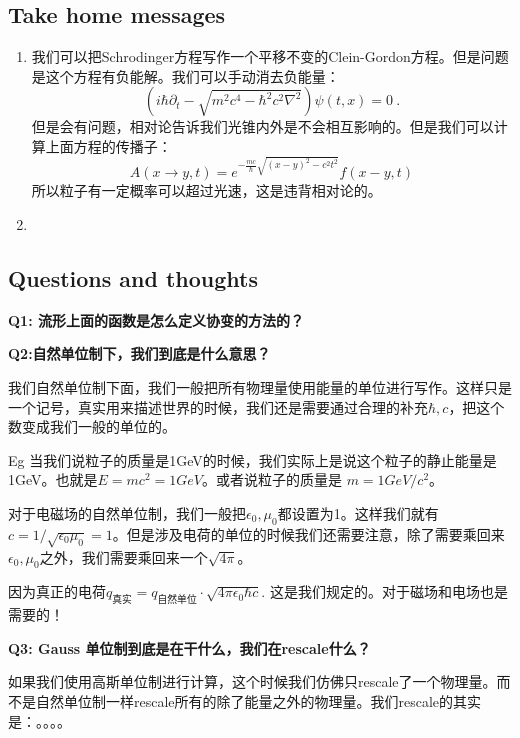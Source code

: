 \subsection{Take home messages}

\begin{enumerate}
  \item 我们可以把Schrodinger方程写作一个平移不变的Clein-Gordon方程。但是问题是这个方程有负能解。我们可以手动消去负能量：
    \begin{equation}
      (i\hbar\partial_t-\sqrt{m^2c^4-\hbar^2c^2\nabla^2})\psi(t,x)=0\mathrm{~.}
      \label{eq:nonegativenergyspectrum}
    \end{equation}
    但是会有问题，相对论告诉我们光锥内外是不会相互影响的。但是我们可以计算上面方程的传播子：
    \begin{equation}
      A(x\to y,t)=e^{-\frac{mc}{\hbar}\sqrt{(x-y)^2-c^2t^2}}f(x-y,t)
      \label{eq:propergagtiontest}
    \end{equation}
    所以粒子有一定概率可以超过光速，这是违背相对论的。
  \item 
\end{enumerate}

\subsection{Questions and thoughts}
\textbf{Q1: 流形上面的函数是怎么定义协变的方法的？}



\textbf{Q2:自然单位制下，我们到底是什么意思？}

我们自然单位制下面，我们一般把所有物理量使用能量的单位进行写作。这样只是一个记号，真实用来描述世界的时候，我们还是需要通过合理的补充$ \hbar,c $，把这个数变成我们一般的单位的。

Eg 当我们说粒子的质量是1GeV的时候，我们实际上是说这个粒子的静止能量是1GeV。也就是$ E=mc^2=1GeV $。或者说粒子的质量是 $ m = 1GeV/c^2 $。

对于电磁场的自然单位制，我们一般把$ \epsilon_0,\mu_0 $都设置为1。这样我们就有$ c = 1/\sqrt{\epsilon_0\mu_0} = 1 $。但是涉及电荷的单位的时候我们还需要注意，除了需要乘回来$ \epsilon_0,\mu_0 $之外，我们需要乘回来一个$ \sqrt{4\pi} $。

因为真正的电荷$ q_\text{真实}=q_\text{自然单位}\cdot\sqrt{4\pi\epsilon_0\hbar c}. $ 这是我们规定的。对于磁场和电场也是需要的！


\textbf{Q3: Gauss 单位制到底是在干什么，我们在rescale什么？}

如果我们使用高斯单位制进行计算，这个时候我们仿佛只rescale了一个物理量。而不是自然单位制一样rescale所有的除了能量之外的物理量。我们rescale的其实是：。。。。



